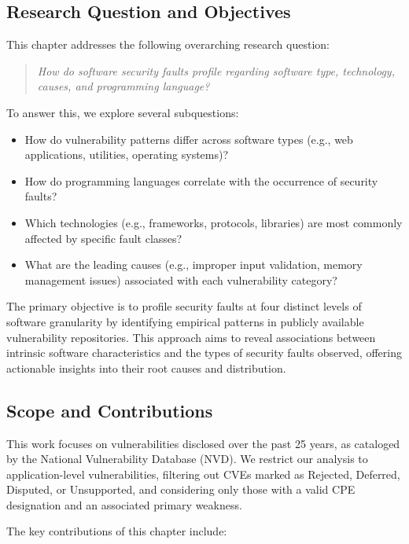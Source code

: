 \subsection{Research Question and Objectives}

This chapter addresses the following overarching research question:

\begin{quote}
\textit{How do software security faults profile regarding software type, technology, causes, and programming language?}
\end{quote}

To answer this, we explore several subquestions:

\begin{itemize}
    \item How do vulnerability patterns differ across software types (e.g., web applications, utilities, operating systems)?
    \item How do programming languages correlate with the occurrence of security faults?
    \item Which technologies (e.g., frameworks, protocols, libraries) are most commonly affected by specific fault classes?
    \item What are the leading causes (e.g., improper input validation, memory management issues) associated with each vulnerability category?
\end{itemize}

The primary objective is to profile security faults at four distinct levels of software granularity by identifying empirical patterns in publicly available vulnerability repositories. This approach aims to reveal associations between intrinsic software characteristics and the types of security faults observed, offering actionable insights into their root causes and distribution.

\subsection{Scope and Contributions}

This work focuses on vulnerabilities disclosed over the past 25 years, as cataloged by the National Vulnerability Database (NVD). We restrict our analysis to application-level vulnerabilities, filtering out CVEs marked as Rejected, Deferred, Disputed, or Unsupported, and considering only those with a valid CPE designation and an associated primary weakness.

The key contributions of this chapter include:

